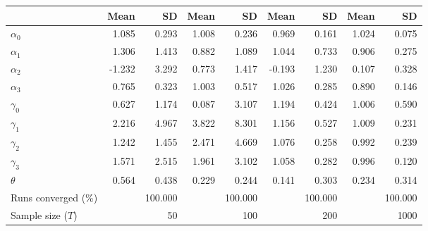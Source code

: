
\begin{tabular}[t]{lrrrrrrrr}
\toprule
  & Mean & SD & Mean  & SD  & Mean   & SD   & Mean    & SD   \\
\midrule
$\alpha_{0}$ & 1.085 & 0.293 & 1.008 & 0.236 & 0.969 & 0.161 & 1.024 & 0.075\\
$\alpha_{1}$ & 1.306 & 1.413 & 0.882 & 1.089 & 1.044 & 0.733 & 0.906 & 0.275\\
$\alpha_{2}$ & -1.232 & 3.292 & 0.773 & 1.417 & -0.193 & 1.230 & 0.107 & 0.328\\
$\alpha_{3}$ & 0.765 & 0.323 & 1.003 & 0.517 & 1.026 & 0.285 & 0.890 & 0.146\\
$\gamma_{0}$ & 0.627 & 1.174 & 0.087 & 3.107 & 1.194 & 0.424 & 1.006 & 0.590\\
$\gamma_{1}$ & 2.216 & 4.967 & 3.822 & 8.301 & 1.156 & 0.527 & 1.009 & 0.231\\
$\gamma_{2}$ & 1.242 & 1.455 & 2.471 & 4.669 & 1.076 & 0.258 & 0.992 & 0.239\\
$\gamma_{3}$ & 1.571 & 2.515 & 1.961 & 3.102 & 1.058 & 0.282 & 0.996 & 0.120\\
$\theta$ & 0.564 & 0.438 & 0.229 & 0.244 & 0.141 & 0.303 & 0.234 & 0.314\\
Runs converged (\%) &  & 100.000 &  & 100.000 &  & 100.000 &  & 100.000\\
Sample size ($T$) &  & 50 &  & 100 &  & 200 &  & 1000\\
\bottomrule
\end{tabular}
